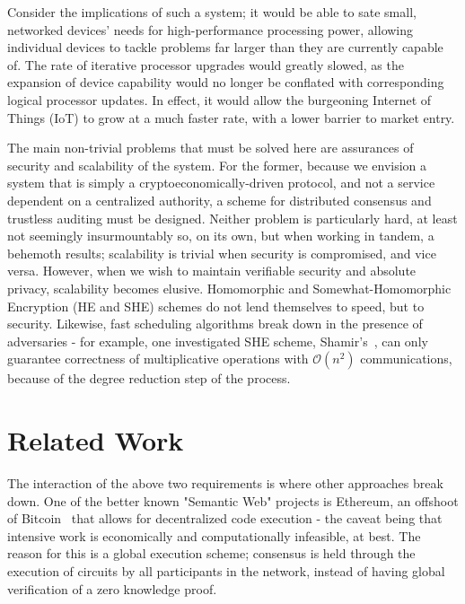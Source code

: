 \documentclass[journal,11pt]{IEEEtran}
\begin{document}
\par Consider the implications of such a system; it would be able to sate small, networked devices' needs for high-performance processing power, allowing individual devices to tackle problems far larger than they are currently capable of. The rate of iterative processor upgrades would greatly slowed, as the expansion of device capability would no longer be conflated with corresponding logical processor updates. In effect, it would allow the burgeoning Internet of Things (IoT) to grow at a much faster rate, with a lower barrier to market entry.

\par The main non-trivial problems that must be solved here are assurances of security and scalability of the system. For the former, because we envision a system that is simply a cryptoeconomically-driven protocol, and not a service dependent on a centralized authority, a scheme for distributed consensus and trustless auditing must be designed. Neither problem is particularly hard, at least not seemingly insurmountably so, on its own, but when working in tandem, a behemoth results; scalability is trivial when security is compromised, and vice versa. However, when we wish to maintain verifiable security and absolute privacy, scalability becomes elusive. Homomorphic and Somewhat-Homomorphic Encryption (HE and SHE) schemes do not lend themselves to speed, but to security. Likewise, fast scheduling algorithms break down in the presence of adversaries - for example, one investigated SHE scheme, Shamir's~\cite{Shamir1979HowSecret}, can only guarantee correctness of multiplicative operations with $\mathcal{O}(n^2)$ communications, because of the degree reduction step of the process. 


\section{Related Work}
\par The interaction of the above two requirements is where other approaches break down. One of the better known "Semantic Web" projects is Ethereum\cite{Wood2014Ethereum:Ledger}, an offshoot of Bitcoin~\cite{Nakamoto2008Bitcoin:System} that allows for decentralized code execution - the caveat being that intensive work is economically and computationally infeasible, at best. The reason for this is a global execution scheme; consensus is held through the execution of circuits by all participants in the network, instead of having global verification of a zero knowledge proof. 
\end{document}
